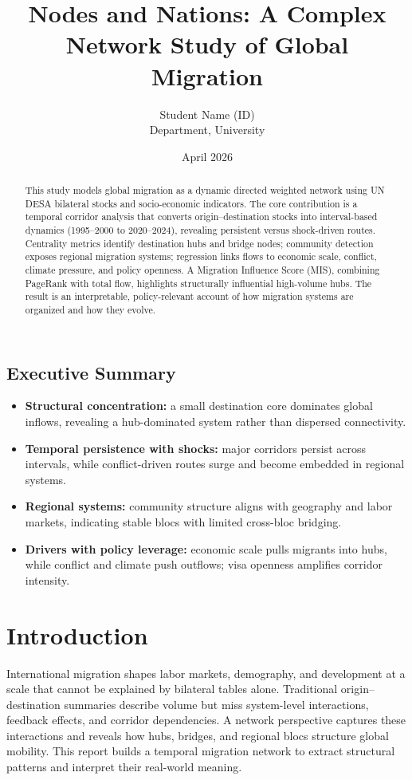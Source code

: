 \documentclass[12pt]{report}
\title{Nodes and Nations: A Complex Network Study of Global Migration}
\author{Student Name (ID) \\ Department, University}
\date{April 2026}
\begin{document}
\maketitle

\begin{abstract}
This study models global migration as a dynamic directed weighted network using UN DESA bilateral stocks and socio-economic indicators. The core contribution is a temporal corridor analysis that converts origin--destination stocks into interval-based dynamics (1995--2000 to 2020--2024), revealing persistent versus shock-driven routes. Centrality metrics identify destination hubs and bridge nodes; community detection exposes regional migration systems; regression links flows to economic scale, conflict, climate pressure, and policy openness. A Migration Influence Score (MIS), combining PageRank with total flow, highlights structurally influential high-volume hubs. The result is an interpretable, policy-relevant account of how migration systems are organized and how they evolve.
\end{abstract}

\section*{Executive Summary}
\begin{itemize}
  \item \textbf{Structural concentration:} a small destination core dominates global inflows, revealing a hub-dominated system rather than dispersed connectivity.
  \item \textbf{Temporal persistence with shocks:} major corridors persist across intervals, while conflict-driven routes surge and become embedded in regional systems.
  \item \textbf{Regional systems:} community structure aligns with geography and labor markets, indicating stable blocs with limited cross-bloc bridging.
  \item \textbf{Drivers with policy leverage:} economic scale pulls migrants into hubs, while conflict and climate push outflows; visa openness amplifies corridor intensity.
\end{itemize}

\tableofcontents
\listoffigures
\listoftables
\newpage

\chapter{Introduction}
International migration shapes labor markets, demography, and development at a scale that cannot be explained by bilateral tables alone. Traditional origin--destination summaries describe volume but miss system-level interactions, feedback effects, and corridor dependencies. A network perspective captures these interactions and reveals how hubs, bridges, and regional blocs structure global mobility. This report builds a temporal migration network to extract structural patterns and interpret their real-world meaning.
\end{document}
